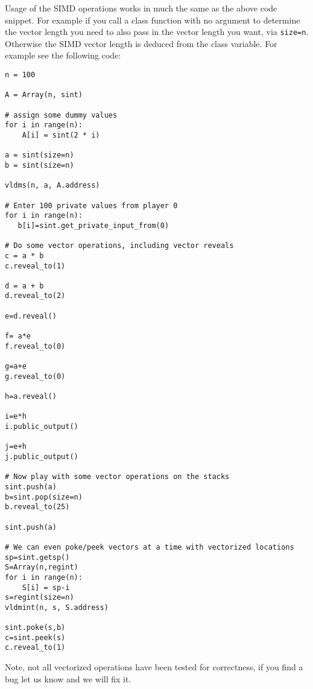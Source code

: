 Usage of the SIMD operations works in much the same as the above code snippet.
For example if you call a class function with no argument to determine the
vector length you need to also pass in the vector length you want, via
\verb|size=n|. Otherwise the SIMD vector length is deduced from the class
variable.
For example see the following code:
\begin{lstlisting}
n = 100

A = Array(n, sint)

# assign some dummy values
for i in range(n):
    A[i] = sint(2 * i)

a = sint(size=n)
b = sint(size=n)

vldms(n, a, A.address)

# Enter 100 private values from player 0
for i in range(n):
   b[i]=sint.get_private_input_from(0)

# Do some vector operations, including vector reveals
c = a * b
c.reveal_to(1)

d = a + b
d.reveal_to(2)

e=d.reveal()

f= a*e
f.reveal_to(0)

g=a+e
g.reveal_to(0)

h=a.reveal()

i=e*h
i.public_output()

j=e+h
j.public_output()

# Now play with some vector operations on the stacks
sint.push(a)
b=sint.pop(size=n)
b.reveal_to(25)

sint.push(a)

# We can even poke/peek vectors at a time with vectorized locations
sp=sint.getsp()
S=Array(n,regint)
for i in range(n):
    S[i] = sp-i
s=regint(size=n)
vldmint(n, s, S.address)

sint.poke(s,b)
c=sint.peek(s)
c.reveal_to(1)

\end{lstlisting}
Note, not all vectorized operations have been tested for correctness, if you
find a bug let us know and we will fix it.



